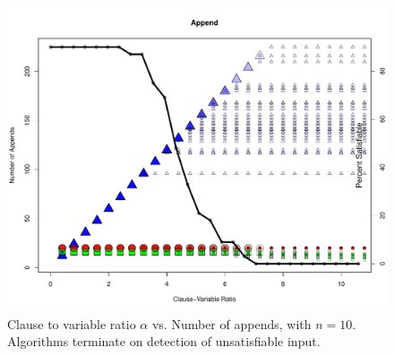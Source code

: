 \begin{figure}[htdp]

\begin{center}

\includegraphics[width=1.1\textwidth]{./figures/metricOutput_n10/appendCount.pdf}

\caption{Clause to variable ratio $\alpha$ vs. Number of appends, with $n = 10$.  Algorithms terminate on detection of unsatisfiable input. }
\label{appendFig_10}
\end{center}
\end{figure}

\FloatBarrier
			
